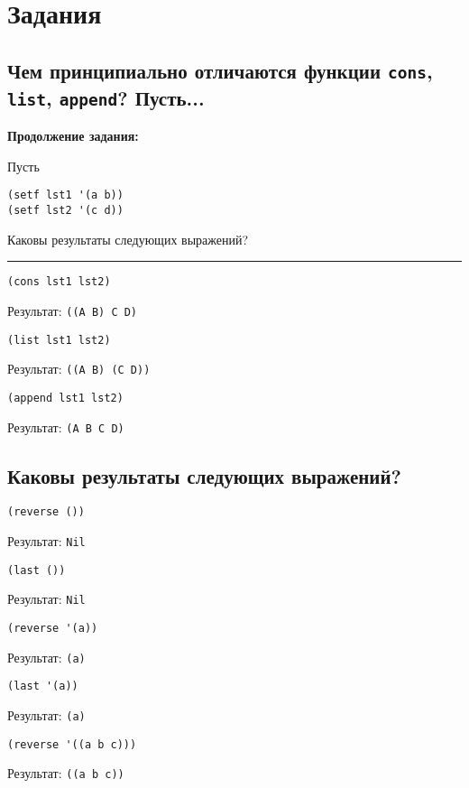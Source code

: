 \chapter{Задания}

\section{Чем принципиально отличаются функции \texttt{cons}, \texttt{list}, \texttt{append}? Пусть...}

\textbf{Продолжение задания:} 

Пусть
\begin{lstlisting}
(setf lst1 '(a b))
(setf lst2 '(c d))
\end{lstlisting}

Каковы результаты следующих выражений?

\noindent\rule{12cm}{0.4pt}

\begin{lstlisting}
(cons lst1 lst2)
\end{lstlisting}
Результат: \texttt{((A B) C D)}

\begin{lstlisting}
(list lst1 lst2)
\end{lstlisting}
Результат: \texttt{((A B) (C D))}

\begin{lstlisting}
(append lst1 lst2)
\end{lstlisting}
Результат: \texttt{(A B C D)}

\section{Каковы результаты следующих выражений?}

\begin{lstlisting}
(reverse ())
\end{lstlisting}
Результат: \texttt{Nil}

\begin{lstlisting}
(last ())
\end{lstlisting}
Результат: \texttt{Nil}

\begin{lstlisting}
(reverse '(a))
\end{lstlisting}
Результат: \texttt{(a)}

\begin{lstlisting}
(last '(a))
\end{lstlisting}
Результат: \texttt{(a)}

\begin{lstlisting}
(reverse '((a b c)))
\end{lstlisting}
Результат: \texttt{((a b c))}


